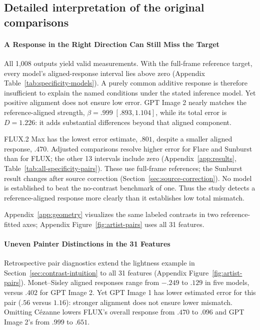 \subsection{Detailed interpretation of the original comparisons}
\paragraph{A Response in the Right Direction Can Still Miss the Target}
All 1,008 outputs yield valid measurements. With the full-frame
reference target, every model's aligned-response interval lies above zero
(Appendix Table~\ref{tab:specificity-models}). A purely common additive response is
therefore insufficient to explain the named conditions under the stated
inference model. Yet positive alignment does not ensure low error. GPT Image 2
nearly matches the reference-aligned strength, $\beta=.999\;[.893,1.104]$,
while its total error is $D=1.226$: it adds substantial differences beyond
that aligned component.




FLUX.2 Max has the lowest error estimate, $.801$, despite a smaller aligned
response, $.470$. Adjusted comparisons resolve higher error for Flare and Sunburst
than for FLUX; the other 13 intervals include zero (Appendix~\ref{app:results},
Table~\ref{tab:all-specificity-pairs}).
These use full-frame references;
the Sunburst result changes after source correction
(Section~\ref{sec:source-correction}). No model is established to beat the
no-contrast benchmark of one. Thus the study detects a
reference-aligned response more clearly than it establishes low total mismatch.

Appendix~\ref{app:geometry} visualizes the same labeled contrasts in two
reference-fitted axes; Appendix Figure~\ref{fig:artist-pairs} uses all 31 features.



\paragraph{Uneven Painter Distinctions in the 31 Features}
Retrospective pair diagnostics extend the lightness example in
Section~\ref{sec:contrast-intuition} to all 31 features (Appendix Figure~\ref{fig:artist-pairs}).
Monet--Sisley aligned responses range from $-.249$ to $.129$ in five models,
versus $.402$ for GPT Image 2. Yet GPT Image 1 has lower estimated error for this pair
($.56$ versus $1.16$): stronger alignment does not ensure lower mismatch.
Omitting C\'ezanne lowers FLUX's overall response from $.470$ to $.096$ and
GPT Image 2's from $.999$ to $.651$.

